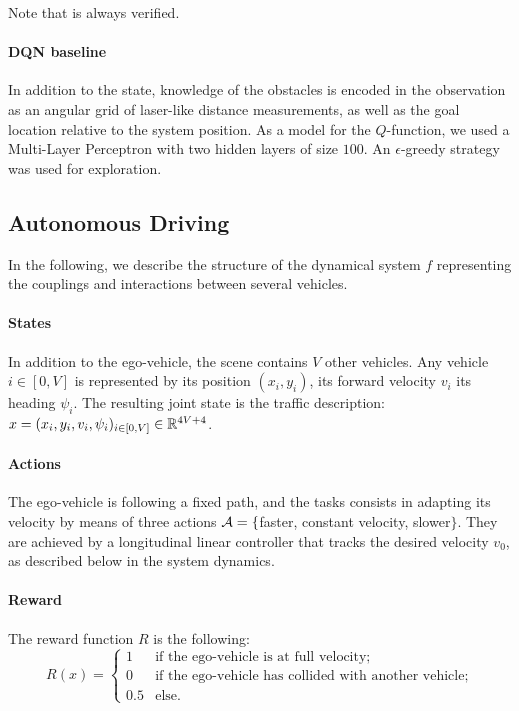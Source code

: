 \documentclass{article}
\begin{document}
Note that  is always verified. 

\paragraph{DQN baseline}

In addition to the state, knowledge of the obstacles is encoded in the observation as an angular grid of laser-like distance measurements, as well as the goal location relative to the system position.
As a model for the $Q$-function, we used a Multi-Layer Perceptron with two hidden layers of size $100$. An $\epsilon$-greedy strategy was used for exploration.

\subsection{Autonomous Driving}

In the following, we describe the structure of the dynamical system $f$ representing the couplings and interactions between several vehicles.

\paragraph{States}

In addition to the ego-vehicle, the scene contains $V$ other vehicles. Any vehicle $i\in[0,V]$ is represented by its position $(x_i, y_i)$, its forward velocity $v_i$ its heading $\psi_i$. The resulting joint state is the traffic description: $x = (x_i, y_i, v_i, \psi_i)_{i\in[0,V]}\in\mathbb{R}^{4V+4}$.

\paragraph{Actions}

The ego-vehicle is following a fixed path, and the tasks consists in adapting its velocity by means of three actions $\mathcal{A} = \{$faster, constant velocity, slower$\}$. They are achieved by a longitudinal linear controller that tracks the desired velocity $v_0$, as described below in the system dynamics.

\paragraph{Reward}

The reward function $R$ is the following:
\[
R(x) = 
\begin{cases}
1 & \text{if the ego-vehicle is at full velocity;}\\
0 & \text{if the ego-vehicle has collided with another vehicle;}\\
0.5 & \text{else.}
\end{cases}\]
\end{document}
